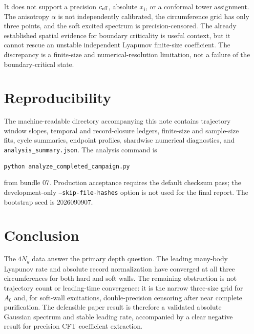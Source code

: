 \documentclass[aps,prb,twocolumn,floatfix,nofootinbib,superscriptaddress]{revtex4-2}
\begin{document}
It does not support a precision $c_{\rm eff}$, absolute $x_i$, or a conformal
tower assignment.  The anisotropy $\alpha$ is not independently calibrated,
the circumference grid has only three points, and the soft excited spectrum is
precision-censored.  The already established spatial evidence for boundary
criticality is useful context, but it cannot rescue an unstable independent
Lyapunov finite-size coefficient.  The discrepancy is a finite-size and
numerical-resolution limitation, not a failure of the boundary-critical state.

\section{Reproducibility}

The machine-readable directory accompanying this note contains trajectory
window slopes, temporal and record-closure ledgers, finite-size and sample-size
fits, cycle summaries, endpoint profiles, shardwise numerical diagnostics, and
\texttt{analysis\_summary.json}.  The analysis command is
\begin{verbatim}
python analyze_completed_campaign.py
\end{verbatim}
from bundle 07.  Production acceptance requires the default checksum pass;
the development-only \texttt{--skip-file-hashes} option is not used for the
final report.  The bootstrap seed is 2026090907.

\section{Conclusion}

The $4N_y$ data answer the primary depth question.  The leading many-body
Lyapunov rate and absolute record normalization have converged at all three
circumferences for both hard and soft walls.  The remaining obstruction is not
trajectory count or leading-time convergence: it is the narrow three-size grid
for $A_0$ and, for soft-wall excitations, double-precision censoring after near
complete purification.  The defensible paper result is therefore a validated
absolute Gaussian spectrum and stable leading rate, accompanied by a clear
negative result for precision CFT coefficient extraction.
\end{document}
